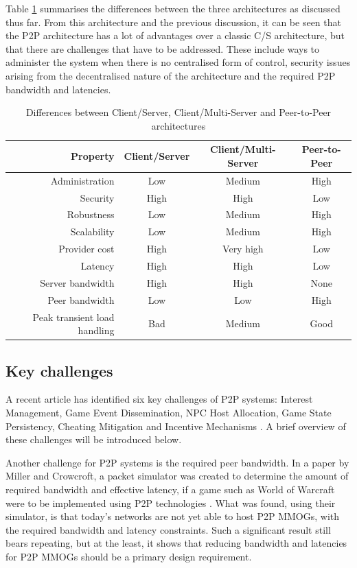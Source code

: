 \documentclass[10pt,a4paper,journal,cspaper,compsoc]{IEEEtran}
\begin{document}
Table \ref{tab_archs} summarises the differences between the three architectures as discussed thus far. From this architecture and the previous
discussion, it can be seen that the P2P architecture has a lot of advantages over a classic C/S architecture, but that there are challenges that have
to be addressed. These include ways to administer the system when there is no centralised form of control, security issues arising from the
decentralised nature of the architecture and the required P2P bandwidth and latencies.
%
\begin{table}[htbp]
\centering
\begin{tabular}{|r|c|c|c|}
\hline
Property & Client/Server & Client/Multi-Server & Peer-to-Peer\\
\hline
Administration & Low & Medium & High\\
Security & High & High & Low\\
Robustness & Low & Medium & High\\
Scalability & Low & Medium & High\\
Provider cost & High & Very high & Low\\
Latency & High & High & Low\\
Server bandwidth & High & High & None\\
Peer bandwidth & Low & Low & High\\
Peak transient load handling & Bad & Medium & Good\\
\hline
\end{tabular}
\caption{Differences between Client/Server, Client/Multi-Server and Peer-to-Peer architectures} \label{tab_archs}
\end{table}

\subsection{Key challenges}
\label{key_challenges}

A recent article has identified six key challenges of P2P systems: Interest Management, Game Event Dissemination, NPC Host Allocation, Game State
Persistency, Cheating Mitigation and Incentive Mechanisms \cite{Fan_deisgn_issues_p2p}. A brief overview of these challenges will be introduced
below.

Another challenge for P2P systems is the required peer bandwidth. In a paper by Miller and Crowcroft, a packet simulator was created to determine the
amount of required bandwidth and effective latency, if a game such as World of Warcraft were to be implemented using P2P technologies
\cite{Miller_p2p_infeasability}. What was found, using their simulator, is that today's networks are not yet able to host P2P MMOGs, with the
required bandwidth and latency constraints. Such a significant result still bears repeating, but at the least, it shows that reducing bandwidth and
latencies for P2P MMOGs should be a primary design requirement.
\end{document}
